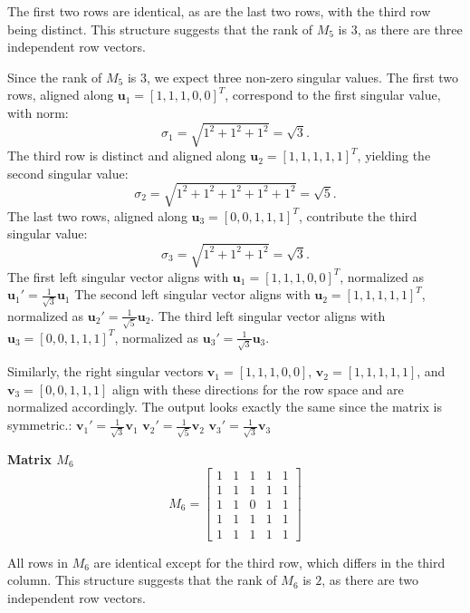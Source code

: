 \documentclass[a4paper,oneside,bibliography=totoc]{scrartcl}
\begin{document}
The first two rows are identical, as are the last two rows, with the third row being distinct. This structure suggests that the rank of \( M_5 \) is \( 3 \), as there are three independent row vectors.

Since the rank of \( M_5 \) is \( 3 \), we expect three non-zero singular values. The first two rows, aligned along \( \mathbf{u}_1 = [1, 1, 1, 0, 0]^T \), correspond to the first singular value, with norm:
   \[
   \sigma_1 = \sqrt{1^2 + 1^2 + 1^2} = \sqrt{3}.
   \]
The third row is distinct and aligned along \( \mathbf{u}_2 = [1, 1, 1, 1, 1]^T \), yielding the second singular value:
   \[
   \sigma_2 = \sqrt{1^2 + 1^2 + 1^2 + 1^2 + 1^2} = \sqrt{5}.
   \]
The last two rows, aligned along \( \mathbf{u}_3 = [0, 0, 1, 1, 1]^T \), contribute the third singular value:
   \[
   \sigma_3 = \sqrt{1^2 + 1^2 + 1^2} = \sqrt{3}.
   \]
The first left singular vector aligns with \( \mathbf{u}_1 = [1, 1, 1, 0, 0]^T \), normalized as $\mathbf{u}_1' = \frac{1}{\sqrt{3}} \mathbf{u}_1$
The second left singular vector aligns with \( \mathbf{u}_2 = [1, 1, 1, 1, 1]^T \), normalized as $\mathbf{u}_2' = \frac{1}{\sqrt{5}} \mathbf{u}_2$.
The third left singular vector aligns with \( \mathbf{u}_3 = [0, 0, 1, 1, 1]^T \), normalized as $\mathbf{u}_3' = \frac{1}{\sqrt{3}} \mathbf{u}_3$.

Similarly, the right singular vectors \( \mathbf{v}_1 = [1, 1, 1, 0, 0]\), \( \mathbf{v}_2 = [1, 1, 1, 1, 1]\), and \( \mathbf{v}_3 = [0, 0, 1, 1, 1]\) align with these directions for the row space and are normalized accordingly. The output looks exactly the same since the matrix is symmetric.: 
$\mathbf{v}_1' = \frac{1}{\sqrt{3}} \mathbf{v}_1$
$\mathbf{v}_2' = \frac{1}{\sqrt{5}} \mathbf{v}_2$
$\mathbf{v}_3' = \frac{1}{\sqrt{3}} \mathbf{v}_3$

\textbf{Matrix \( M_6 \)}
\[
M_6 = \begin{bmatrix} 1 & 1 & 1 & 1 & 1 \\ 1 & 1 & 1 & 1 & 1 \\ 1 & 1 & 0 & 1 & 1 \\ 1 & 1 & 1 & 1 & 1 \\ 1 & 1 & 1 & 1 & 1 \end{bmatrix}
\]

All rows in \( M_6 \) are identical except for the third row, which differs in the third column. This structure suggests that the rank of \( M_6 \) is \( 2 \), as there are two independent row vectors.
\end{document}
